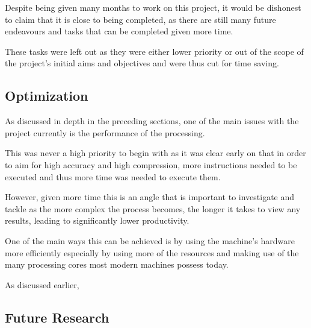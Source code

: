 \documentclass[12pt]{article}
\newcommand{\sentence}{} %
\begin{document}
    \tab
    Despite being given many months to work on this project, it would be dishonest to claim that it is close to being
    completed, as there are still many future endeavours and tasks that can be completed given more time.
    \sentence
    These tasks were left out as they were either lower priority or out of the scope of the project's initial aims
    and objectives and were thus cut for time saving.
    \sentence

    \subsection{Optimization}\label{subsec:optimization}

    \tab
    As discussed in depth in the preceding sections, one of the main issues with the project currently is the
    performance of the processing.
    \sentence
    This was never a high priority to begin with as it was clear early on that in order to aim for high accuracy and
    high compression, more instructions needed to be executed and thus more time was needed to execute them.
    \sentence
    However, given more time this is an angle that is important to investigate and tackle as the more complex the
    process becomes, the longer it takes to view any results, leading to significantly lower productivity.
    \sentence
    One of the main ways this can be achieved is by using the machine's hardware more efficiently especially by using
    more of the resources and making use of the many processing cores most modern machines possess today.
    \sentence
    As discussed earlier, %

    \subsection{Future Research}\label{subsec:future-research}
\end{document}
